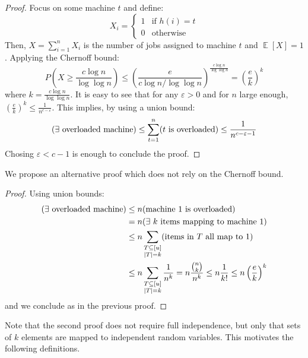 \documentclass[11pt]{article}
\DeclareMathOperator*{\E}{\mathbb{E}}
\let\Pr\relax
\DeclareMathOperator*{\Pr}{\mathbb{P}}
\newcommand{\eps}{\varepsilon}
\theoremstyle{definition}
\begin{document}
\begin{proof}
    Focus on some machine $t$ and define:
    \begin{displaymath}
        X_i= \begin{cases}
            1 &\text{if $h(i) = t$}\\
            0&\text{otherwise}
        \end{cases}
    \end{displaymath}
    Then, $X=\sum_{i=1}^n X_i$ is the number of jobs assigned to machine $t$
    and $\E[X]=1$. Applying the Chernoff bound:
    \begin{displaymath}
        P\left(X\geq \frac{c\log n}{\log \log n}\right) \leq
    \left(\frac{e}{c\log n/\log\log n}\right)^{\frac{c\log
    n}{\log\log n}} = \left(\frac{e}{k}\right)^k
    \end{displaymath}
    where $k=\frac{c\log n}{\log \log n}$. It is easy to see that for any
    $\eps>0$ and for $n$ large enough, $\left(\frac{e}{k}\right)^k \leq
    \frac{1}{n^{c-\eps}}$. This
    implies, by using a union bound:
    \begin{displaymath}
        \Pr(\exists\text{ overloaded machine})
        \leq \sum_{t=1}^n \Pr (t\text{ is overloaded})
        \leq \frac{1}{n^{c-\eps-1}}
    \end{displaymath}
    Chosing $\eps < c-1$ is enough to conclude the proof.
\end{proof}

We propose an alternative proof which does not rely on the Chernoff bound.

\begin{proof}
    Using union bounds:
    \begin{align*}
    \Pr(\exists\text{ overloaded machine})
    &\leq n \Pr(\text{machine 1 is overloaded})\\
    &=n\Pr(\exists \text{ $k$ items mapping to machine 1})\\
    &\leq n\sum_{\substack{T\subseteq[u]\\|T|=k}} \Pr (\text{items in $T$ all
    map to 1})\\
    &\leq n\sum_{\substack{T\subseteq[u]\\|T|=k}} \frac{1}{n^k}
    = n\frac{\binom{n}{k}}{n^k}\leq n\frac{1}{k!}
    \leq n\left(\frac{e}{k}\right)^{k}
\end{align*}
and we conclude as in the previous proof.
\end{proof}

Note that the second proof does not require full independence, but only that
sets of $k$ elements are mapped to independent random variables. This motivates
the following definitions.
\end{document}
